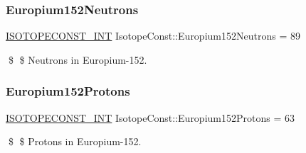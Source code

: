 \subsubsection{\texorpdfstring{Europium152\+Neutrons}{Europium152Neutrons}}
{\footnotesize\ttfamily \mbox{\hyperlink{group___isotope_const-_macros_ga5f18360b3e99483a35c32d789e62621c}{I\+S\+O\+T\+O\+P\+E\+C\+O\+N\+S\+T\+\_\+\+I\+NT}} Isotope\+Const\+::\+Europium152\+Neutrons = 89}

\$ \$ Neutrons in Europium-\/152. \mbox{\label{group___isotope_const-_europium-_eu152_ga3b61a65a88040d2e0635f77de8fa7c19}} 
\subsubsection{\texorpdfstring{Europium152\+Protons}{Europium152Protons}}
{\footnotesize\ttfamily \mbox{\hyperlink{group___isotope_const-_macros_ga5f18360b3e99483a35c32d789e62621c}{I\+S\+O\+T\+O\+P\+E\+C\+O\+N\+S\+T\+\_\+\+I\+NT}} Isotope\+Const\+::\+Europium152\+Protons = 63}

\$ \$ Protons in Europium-\/152. 